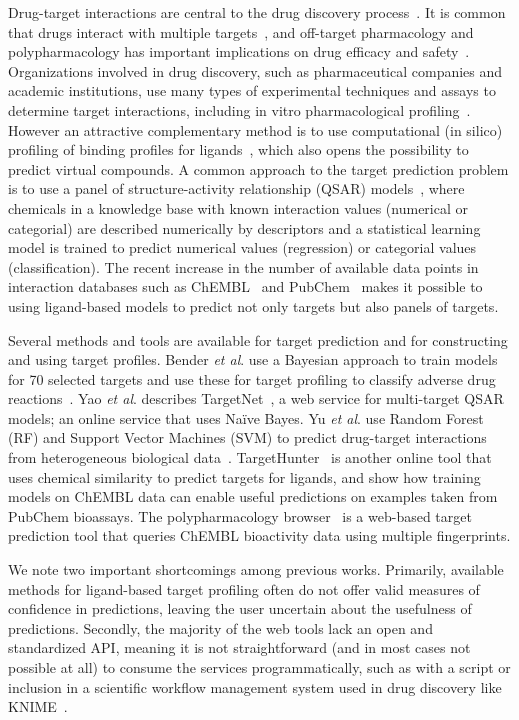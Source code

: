 \documentclass[utf8]{frontiersSCNS} %
\begin{document}
Drug-target interactions are central to the drug discovery
process~\cite{Yildirim:2007vh}. It is common that drugs interact with multiple
targets~\cite{hopkins2008network}, and off-target pharmacology and
polypharmacology has important implications on drug efficacy and
safety~\cite{Peters:2013yg,Ravikumar:2018qd}. Organizations involved in drug
discovery, such as pharmaceutical companies and academic institutions, use many
types of experimental techniques and assays to determine target interactions,
including in vitro pharmacological profiling~\cite{Bowes2012}. However an
attractive complementary method is to use computational (in silico) profiling
of binding profiles for ligands~\cite{Cereto-Massague:2015px}, which also opens the possibility
to predict virtual compounds. A common approach to the target prediction
problem is to use a panel of structure-activity relationship (QSAR)
models~\cite{HanschQSAR}, where chemicals in a knowledge base with known
interaction values (numerical or categorial) are described numerically by
descriptors and a statistical learning model is trained to predict numerical
values (regression) or categorial values (classification). The recent increase
in the number of available data points in interaction databases such as ChEMBL~\cite{Gaulton:2017tm} and
PubChem~\cite{Wang:2017cy} makes it possible to using ligand-based models to predict not only targets but also panels of targets.

Several methods and tools are available for target prediction and for
constructing and using target profiles.
%
Bender \textit{et al}. use a Bayesian approach to train models for 70 selected targets
and use these for target profiling to classify adverse drug
reactions~\cite{Bender:2007ib}.
%
Yao \textit{et al}. describes TargetNet~\cite{Yao:2016ij}, a web service for
multi-target QSAR models; an online service that uses Na\"ive Bayes.
%
Yu \textit{et al}. use Random Forest (RF) and Support Vector Machines (SVM) to predict
drug-target interactions from heterogeneous biological data~\cite{Yu:2012ol}.
%
TargetHunter~\cite{Wang:2013le} is another online tool that uses chemical
similarity to predict targets for ligands, and show how training models on
ChEMBL data can enable useful predictions on examples taken from PubChem
bioassays.
%
The polypharmacology browser~\cite{Awale:2017is} is a web-based target prediction tool that queries ChEMBL bioactivity data using multiple fingerprints.


We note two important shortcomings among previous works. Primarily, available
methods for ligand-based target profiling often do not offer valid measures of
confidence in predictions, leaving the user uncertain about the usefulness of
predictions. Secondly, the majority of the web tools lack an open and
standardized API, meaning it is not straightforward (and in most cases not
possible at all) to consume the services programmatically, such as with a
script or inclusion in a scientific workflow management system used in drug discovery like
KNIME~\cite{Mazanetz:2012gy}.
\end{document}

